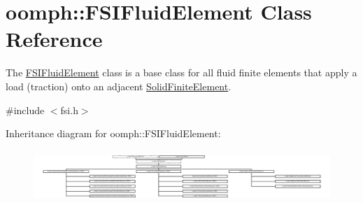 \hypertarget{classoomph_1_1FSIFluidElement}{}\section{oomph\+:\+:F\+S\+I\+Fluid\+Element Class Reference}
\label{classoomph_1_1FSIFluidElement}


The \hyperlink{classoomph_1_1FSIFluidElement}{F\+S\+I\+Fluid\+Element} class is a base class for all fluid finite elements that apply a load (traction) onto an adjacent \hyperlink{classoomph_1_1SolidFiniteElement}{Solid\+Finite\+Element}.  




{\ttfamily \#include $<$fsi.\+h$>$}

Inheritance diagram for oomph\+:\+:F\+S\+I\+Fluid\+Element\+:\begin{figure}[H]
\begin{center}
\leavevmode
\includegraphics[height=1.971831cm]{classoomph_1_1FSIFluidElement}
\end{center}
\end{figure}
